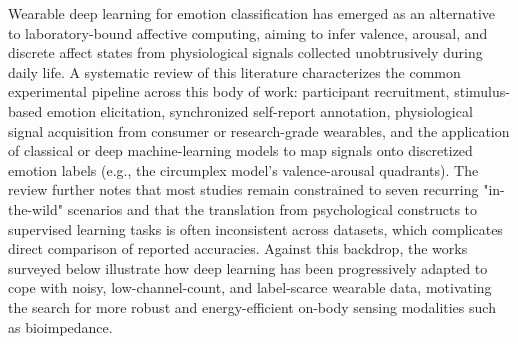 Wearable deep learning for emotion classification has emerged as an alternative to laboratory-bound affective computing, aiming to infer valence, arousal, and discrete affect states from physiological signals collected unobtrusively during daily life. A systematic review of this literature \cite{saganowski2022emotion} characterizes the common experimental pipeline across this body of work: participant recruitment, stimulus-based emotion elicitation, synchronized self-report annotation, physiological signal acquisition from consumer or research-grade wearables, and the application of classical or deep machine-learning models to map signals onto discretized emotion labels (e.g., the circumplex model's valence-arousal quadrants). The review further notes that most studies remain constrained to seven recurring "in-the-wild" scenarios and that the translation from psychological constructs to supervised learning tasks is often inconsistent across datasets, which complicates direct comparison of reported accuracies. Against this backdrop, the works surveyed below illustrate how deep learning has been progressively adapted to cope with noisy, low-channel-count, and label-scarce wearable data, motivating the search for more robust and energy-efficient on-body sensing modalities such as bioimpedance.

